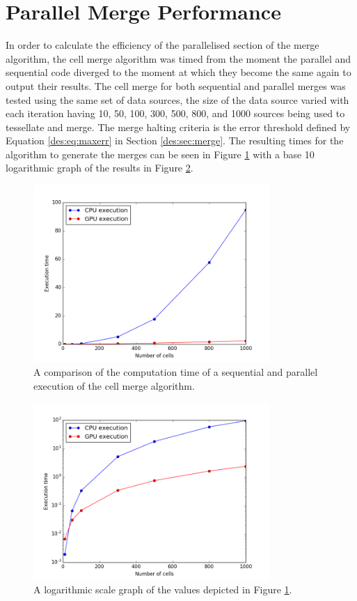 \section{Parallel Merge Performance}
In order to calculate the efficiency of the parallelised section of the merge algorithm, the cell merge algorithm was timed from the moment the parallel and sequential code diverged to the moment at which they become the same again to output their results. The cell merge for both sequential and parallel merges was tested using the same set of data sources, the size of the data source varied with each iteration having 10, 50, 100, 300, 500, 800, and 1000 sources being used to tessellate and merge. The merge halting criteria is the error threshold defined by Equation \ref{des:eq:maxerr} in Section \ref{des:sec:merge}. The resulting times for the algorithm to generate the merges can be seen in Figure \ref{res:fig:cvg} with a base 10 logarithmic graph of the results in Figure \ref{res:fig:cvg_1og}.
\begin{figure}[H]
\centering
\includegraphics[width=0.8\textwidth]{Images/result_cvg.png}
\caption{A comparison of the computation time of a sequential and parallel execution of the cell merge algorithm.}
\label{res:fig:cvg}
\end{figure}
\begin{figure}[H]
\centering
\includegraphics[width=0.8\textwidth]{Images/result_cvg_log.png}
\caption{A logarithmic scale graph of the values depicted in Figure \ref{res:fig:cvg}.}
\label{res:fig:cvg_1og}
\end{figure}
